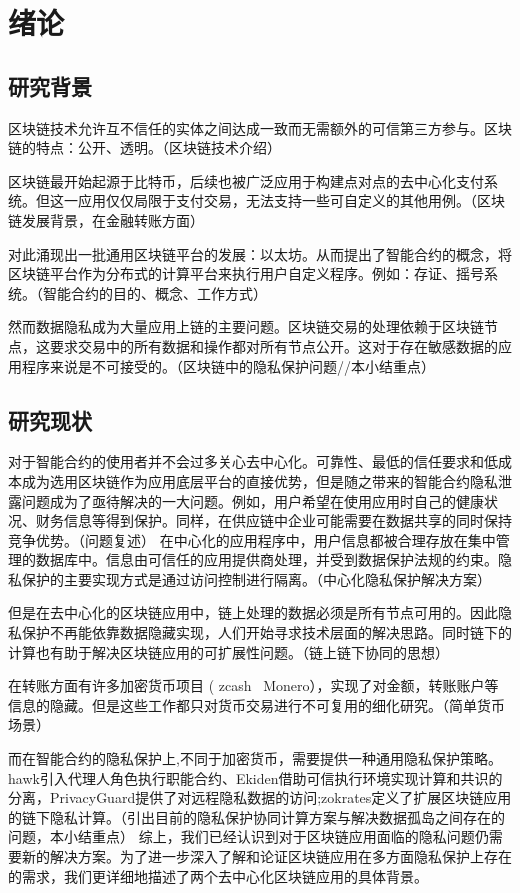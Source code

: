 \chapter{绪论}

\section{研究背景}

区块链技术允许互不信任的实体之间达成一致而无需额外的可信第三方参与。区块链的特点：公开、透明。（区块链技术介绍）

区块链最开始起源于比特币，后续也被广泛应用于构建点对点的去中心化支付系统。但这一应用仅仅局限于支付交易，无法支持一些可自定义的其他用例。（区块链发展背景，在金融转账方面）

对此涌现出一批通用区块链平台的发展：以太坊。从而提出了智能合约的概念，将区块链平台作为分布式的计算平台来执行用户自定义程序。例如：存证、摇号系统。（智能合约的目的、概念、工作方式）

然而数据隐私成为大量应用上链的主要问题。区块链交易的处理依赖于区块链节点，这要求交易中的所有数据和操作都对所有节点公开。这对于存在敏感数据的应用程序来说是不可接受的。（区块链中的隐私保护问题//本小结重点）
\section{研究现状}

对于智能合约的使用者并不会过多关心去中心化。可靠性、最低的信任要求和低成本成为选用区块链作为应用底层平台的直接优势，但是随之带来的智能合约隐私泄露问题成为了亟待解决的一大问题。例如，用户希望在使用应用时自己的健康状况、财务信息等得到保护。同样，在供应链中企业可能需要在数据共享的同时保持竞争优势。（问题复述）
在中心化的应用程序中，用户信息都被合理存放在集中管理的数据库中。信息由可信任的应用提供商处理，并受到数据保护法规的约束。隐私保护的主要实现方式是通过访问控制进行隔离。（中心化隐私保护解决方案）

但是在去中心化的区块链应用中，链上处理的数据必须是所有节点可用的。因此隐私保护不再能依靠数据隐藏实现，人们开始寻求技术层面的解决思路。同时链下的计算也有助于解决区块链应用的可扩展性问题。（链上链下协同的思想）

在转账方面有许多加密货币项目 ( zcash \ Monero），实现了对金额，转账账户等信息的隐藏。但是这些工作都只对货币交易进行不可复用的细化研究。（简单货币场景）

而在智能合约的隐私保护上,不同于加密货币，需要提供一种通用隐私保护策略。hawk引入代理人角色执行职能合约、Ekiden借助可信执行环境实现计算和共识的分离，PrivacyGuard提供了对远程隐私数据的访问;zokrates定义了扩展区块链应用的链下隐私计算。（引出目前的隐私保护协同计算方案与解决数据孤岛之间存在的问题，本小结重点）
综上，我们已经认识到对于区块链应用面临的隐私问题仍需要新的解决方案。为了进一步深入了解和论证区块链应用在多方面隐私保护上存在的需求，我们更详细地描述了两个去中心化区块链应用的具体背景。

